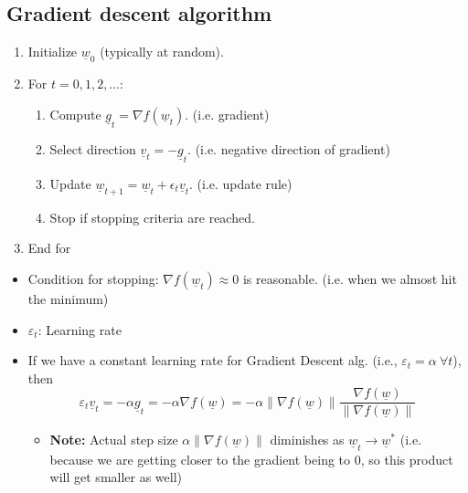 \subsection{Gradient descent algorithm}
\begin{definition}
    \begin{enumerate}
        \item Initialize $\underline{w}_0$ (typically at random).
        \item For $t = 0, 1, 2, \dots$:
        \begin{enumerate}
            \item Compute $\underline{g}_t = \nabla f(\underline{w}_t)$. (i.e. gradient)
            \item Select direction $\underline{v}_t = -\underline{g}_t$. (i.e. negative direction of gradient)
            \item Update $\underline{w}_{t+1} = \underline{w}_t + \epsilon_t \underline{v}_t$. (i.e. update rule)
            \item Stop if stopping criteria are reached.
        \end{enumerate}
        \item End for
    \end{enumerate}
    \vspace{1em}

    \begin{itemize}
        \item Condition for stopping: \( \nabla f(\underline{w}_t) \approx 0 \) is reasonable. (i.e. when we almost hit the minimum)

        \item \( \varepsilon_t \): Learning rate

        \item If we have a constant learning rate for Gradient Descent alg. (i.e., \( \varepsilon_t = \alpha \ \forall t \)), then
        \[
        \varepsilon_t \underline{v}_t = -\alpha \underline{g}_t = -\alpha \nabla f(\underline{w}) = -\alpha \|\nabla f(\underline{w})\| \frac{\nabla f(\underline{w})}{\|\nabla f(\underline{w})\|}
        \]
        \begin{itemize}
            \item \textbf{Note:} Actual step size $\alpha \|\nabla f(\underline{w})\|$ diminishes as \( \underline{w}_t \rightarrow \underline{w}^* \) (i.e. because we are getting closer to the gradient being to 0, so this product will get smaller as well)
        \end{itemize}
    \end{itemize}
\end{definition}

